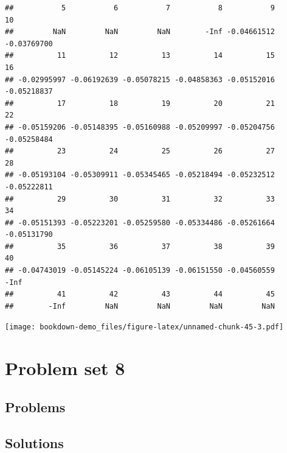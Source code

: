 \documentclass[]{book}
\begin{document}
\begin{enumerate}
\begin{verbatim}
##           5           6           7           8           9          10 
##         NaN         NaN         NaN        -Inf -0.04661512 -0.03769700 
##          11          12          13          14          15          16 
## -0.02995997 -0.06192639 -0.05078215 -0.04858363 -0.05152016 -0.05218837 
##          17          18          19          20          21          22 
## -0.05159206 -0.05148395 -0.05160988 -0.05209997 -0.05204756 -0.05258484 
##          23          24          25          26          27          28 
## -0.05193104 -0.05309911 -0.05345465 -0.05218494 -0.05232512 -0.05222811 
##          29          30          31          32          33          34 
## -0.05151393 -0.05223201 -0.05259580 -0.05334486 -0.05261664 -0.05131790 
##          35          36          37          38          39          40 
## -0.04743019 -0.05145224 -0.06105139 -0.06151550 -0.04560559        -Inf 
##          41          42          43          44          45 
##        -Inf         NaN         NaN         NaN         NaN
\end{verbatim}

  \texttt{[image: bookdown-demo\_files/figure-latex/unnamed-chunk-45-3.pdf]}
\end{enumerate}

\hypertarget{problem-set-8}{%
\chapter{Problem set 8}\label{problem-set-8}}

\hypertarget{problems}{%
\section{Problems}\label{problems}}

\hypertarget{solutions-4}{%
\section{Solutions}\label{solutions-4}}
\end{document}
